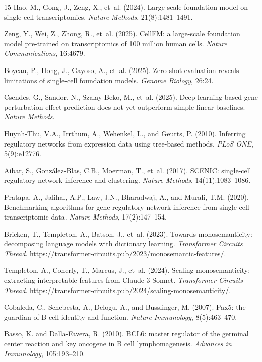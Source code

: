 \documentclass[12pt]{article}
\begin{document}
\begin{thebibliography}{15}
Hao, M., Gong, J., Zeng, X., et~al. (2024).
Large-scale foundation model on single-cell transcriptomics.
\textit{Nature Methods}, 21(8):1481--1491.

Zeng, Y., Wei, Z., Zhong, R., et~al. (2025).
CellFM: a large-scale foundation model pre-trained on transcriptomics of 100 million human cells.
\textit{Nature Communications}, 16:4679.

Boyeau, P., Hong, J., Gayoso, A., et~al. (2025).
Zero-shot evaluation reveals limitations of single-cell foundation models.
\textit{Genome Biology}, 26:24.

Csendes, G., Sandor, N., Szalay-Beko, M., et~al. (2025).
Deep-learning-based gene perturbation effect prediction does not yet outperform simple linear baselines.
\textit{Nature Methods}.

Huynh-Thu, V.A., Irrthum, A., Wehenkel, L., and Geurts, P. (2010).
Inferring regulatory networks from expression data using tree-based methods.
\textit{PLoS ONE}, 5(9):e12776.

Aibar, S., Gonz\'{a}lez-Blas, C.B., Moerman, T., et~al. (2017).
SCENIC: single-cell regulatory network inference and clustering.
\textit{Nature Methods}, 14(11):1083--1086.

Pratapa, A., Jalihal, A.P., Law, J.N., Bharadwaj, A., and Murali, T.M. (2020).
Benchmarking algorithms for gene regulatory network inference from single-cell transcriptomic data.
\textit{Nature Methods}, 17(2):147--154.

Bricken, T., Templeton, A., Batson, J., et~al. (2023).
Towards monosemanticity: decomposing language models with dictionary learning.
\textit{Transformer Circuits Thread}.
\url{https://transformer-circuits.pub/2023/monosemantic-features/}.

Templeton, A., Conerly, T., Marcus, J., et~al. (2024).
Scaling monosemanticity: extracting interpretable features from Claude 3 Sonnet.
\textit{Transformer Circuits Thread}.
\url{https://transformer-circuits.pub/2024/scaling-monosemanticity/}.

Cobaleda, C., Schebesta, A., Delogu, A., and Busslinger, M. (2007).
Pax5: the guardian of B cell identity and function.
\textit{Nature Immunology}, 8(5):463--470.

Basso, K. and Dalla-Favera, R. (2010).
BCL6: master regulator of the germinal center reaction and key oncogene in B cell lymphomagenesis.
\textit{Advances in Immunology}, 105:193--210.

\end{thebibliography}
\end{document}
